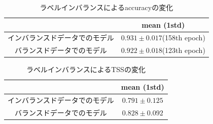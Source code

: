 \documentclass[a4j, 11pt]{jreport}
\begin{document}
\begin{table}[H]
  \centering
	\caption{ラベルインバランスによるaccuracyの変化}
  \begin{tabular}{|c|c|}
		\hline
    & mean (1std) \\ \hline
    インバランスドデータでのモデル & $0.931 \pm 0.017$(158th epoch) \\ \hline
    バランスドデータでのモデル & $0.922 \pm 0.018$(123th epoch) \\ \hline
  \end{tabular}
  \label{tb:accs_4.3}
\end{table}


\begin{table}[H]
  \centering
	\caption{ラベルインバランスによるTSSの変化}
  \begin{tabular}{|c|c|}
		\hline
    & mean (1std) \\ \hline
    インバランスドデータでのモデル & $0.791 \pm 0.125$ \\ \hline
    バランスドデータでのモデル & $0.828 \pm 0.092$ \\ \hline
  \end{tabular}
  \label{tb:TSS_4.3}
\end{table}

\newpage
\end{document}
